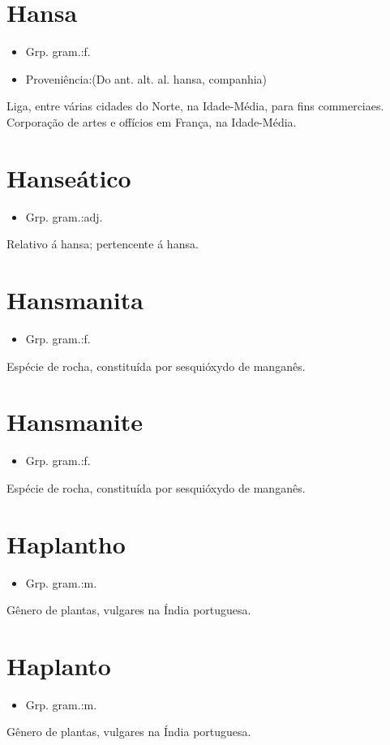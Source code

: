 \documentclass{article}
\begin{document}
\section{Hansa}
\begin{itemize}
\item {Grp. gram.:f.}
\end{itemize}
\begin{itemize}
\item {Proveniência:(Do ant. alt. al. \textunderscore hansa\textunderscore , companhia)}
\end{itemize}
Liga, entre várias cidades do Norte, na Idade-Média, para fins commerciaes.
Corporação de artes e offícios em França, na Idade-Média.
\section{Hanseático}
\begin{itemize}
\item {Grp. gram.:adj.}
\end{itemize}
Relativo á hansa; pertencente á hansa.
\section{Hansmanita}
\begin{itemize}
\item {Grp. gram.:f.}
\end{itemize}
Espécie de rocha, constituída por sesquióxydo de manganês.
\section{Hansmanite}
\begin{itemize}
\item {Grp. gram.:f.}
\end{itemize}
Espécie de rocha, constituída por sesquióxydo de manganês.
\section{Haplantho}
\begin{itemize}
\item {Grp. gram.:m.}
\end{itemize}
Gênero de plantas, vulgares na Índia portuguesa.
\section{Haplanto}
\begin{itemize}
\item {Grp. gram.:m.}
\end{itemize}
Gênero de plantas, vulgares na Índia portuguesa.
\end{document}
